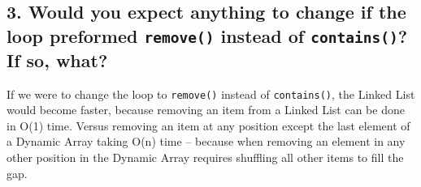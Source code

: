 \documentclass[letter,11pt]{scrartcl}
\begin{document}

\subsection*{3. Would you expect anything to change if the loop preformed
  \texttt{remove()} instead of \texttt{contains()}? If so, what?}

If we were to change the loop to \texttt{remove()} instead of
\texttt{contains()}, the Linked List would become faster, because removing an
item from a Linked List can be done in O(1) time. Versus removing an item at
any position except the last element of a Dynamic Array taking O(n) time --
because when removing an element in any other position in the Dynamic Array
requires shuffling all other items to fill the gap.

\end{document}
